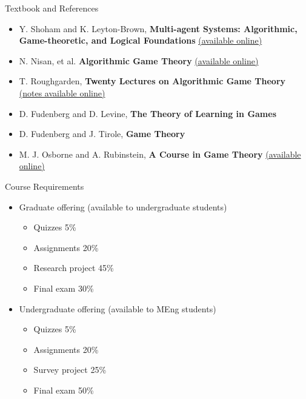 \documentclass[11pt,aspectratio=169,handout]{beamer}
\begin{document}
  \begin{frame}{Textbook and References}
   \footnotesize
   \begin{itemize}
    \setlength{\itemsep}{1em}
    \item Y. Shoham and K. Leyton-Brown, \textbf{Multi-agent Systems: Algorithmic, Game-theoretic, and Logical Foundations} \href{http://www.masfoundations.org/mas.pdf}{(available online)}
    \item	N. Nisan, et al. \textbf{Algorithmic Game Theory} \href{https://www.cs.cmu.edu/~sandholm/cs15-892F13/algorithmic-game-theory.pdf}{(available online)}
    \item T. Roughgarden, \textbf{Twenty Lectures on Algorithmic Game Theory} \href{https://timroughgarden.org/notes.html}{(notes available online)}
    \item D. Fudenberg and D. Levine, \textbf{The Theory of Learning in Games}
    \item D. Fudenberg and J. Tirole, \textbf{Game Theory}
    \item M. J. Osborne and A. Rubinstein, \textbf{A Course in Game Theory} \href{https://books.osborne.economics.utoronto.ca/}{(available online)}
   \end{itemize}
  \end{frame}
 
  \begin{frame}{Course Requirements}
   \begin{itemize}
    \item<+-> Graduate offering (available to undergraduate students)
    \begin{itemize}[<+-| alert@+>]
     \item Quizzes 5\%
     \item Assignments 20\%
     \item Research project 45\%
     \item Final exam 30\%
    \end{itemize}
    \vspace{1.4em}
    \item<+-> Undergraduate offering (available to MEng students)
    \begin{itemize}[<+-| alert@+>]
     \item Quizzes 5\%
     \item Assignments 20\%
     \item Survey project 25\%
     \item Final exam 50\%
    \end{itemize}
   \end{itemize}
  \end{frame}
 
\end{document}
